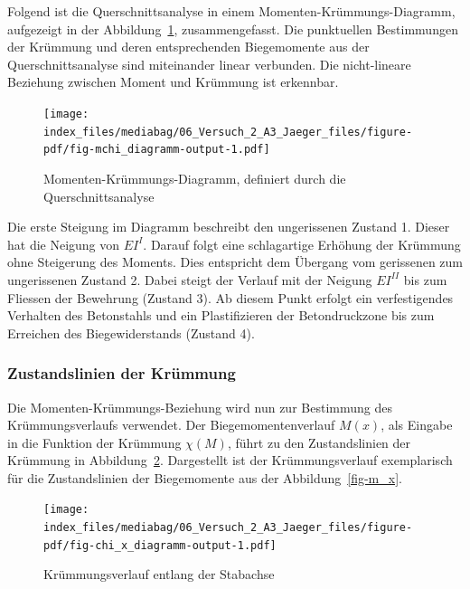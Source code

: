 \documentclass[
  12pt,
  letterpaper,
  egregdoesnotlikesansseriftitles]{scrreprt}
\begin{document}
Folgend ist die Querschnittsanalyse in einem
Momenten-Krümmungs-Diagramm, aufgezeigt in der
Abbildung~\ref{fig-mchi_diagramm}, zusammengefasst. Die punktuellen
Bestimmungen der Krümmung und deren entsprechenden Biegemomente aus der
Querschnittsanalyse sind miteinander linear verbunden. Die nicht-lineare
Beziehung zwischen Moment und Krümmung ist erkennbar.

\begin{figure}[H]

{\centering \texttt{[image: index\_files/mediabag/06\_Versuch\_2\_A3\_Jaeger\_files/figure-pdf/fig-mchi\_diagramm-output-1.pdf]}

}

\caption{\label{fig-mchi_diagramm}Momenten-Krümmungs-Diagramm, definiert
durch die Querschnittsanalyse}

\end{figure}

Die erste Steigung im Diagramm beschreibt den ungerissenen Zustand 1.
Dieser hat die Neigung von \(EI^I\). Darauf folgt eine schlagartige
Erhöhung der Krümmung ohne Steigerung des Moments. Dies entspricht dem
Übergang vom gerissenen zum ungerissenen Zustand 2. Dabei steigt der
Verlauf mit der Neigung \(EI^{II}\) bis zum Fliessen der Bewehrung
(Zustand 3). Ab diesem Punkt erfolgt ein verfestigendes Verhalten des
Betonstahls und ein Plastifizieren der Betondruckzone bis zum Erreichen
des Biegewiderstands (Zustand 4).

\hypertarget{zustandslinien-der-kruxfcmmung}{%
\subsubsection{Zustandslinien der
Krümmung}\label{zustandslinien-der-kruxfcmmung}}

Die Momenten-Krümmungs-Beziehung wird nun zur Bestimmung des
Krümmungsverlaufs verwendet. Der Biegemomentenverlauf \(M(x)\), als
Eingabe in die Funktion der Krümmung \(\chi(M)\), führt zu den
Zustandslinien der Krümmung in Abbildung~\ref{fig-chi_x_diagramm}.
Dargestellt ist der Krümmungsverlauf exemplarisch für die Zustandslinien
der Biegemomente aus der Abbildung~\ref{fig-m_x}.

\begin{figure}[H]

{\centering \texttt{[image: index\_files/mediabag/06\_Versuch\_2\_A3\_Jaeger\_files/figure-pdf/fig-chi\_x\_diagramm-output-1.pdf]}

}

\caption{\label{fig-chi_x_diagramm}Krümmungsverlauf entlang der
Stabachse}

\end{figure}
\end{document}
